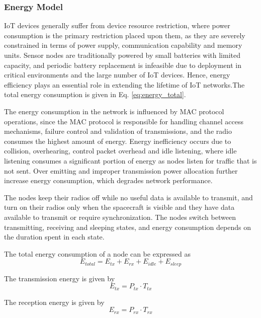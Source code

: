 \documentclass[a4paper,fleqn]{cas-dc}
\numberwithin{equation}{section}
\begin{document}
\subsubsection{Energy Model}

IoT devices generally suffer from device resource restriction, where power consumption is the primary restriction placed upon them, as they are severely constrained in terms of power supply, communication capability and memory units. Sensor nodes are traditionally powered by small batteries with limited capacity, and periodic battery replacement is infeasible due to deployment in critical environments and the large number of IoT devices. Hence, energy efficiency plays an essential role in extending the lifetime of IoT networks.The total energy consumption is given in Eq. \ref{eq:energy_total}.

The energy consumption in the network is influenced by MAC protocol operations, since the MAC protocol is responsible for handling channel access mechanisms, failure control and validation of transmissions, and the radio consumes the highest amount of energy. Energy inefficiency occurs due to collision, overhearing, control packet overhead and idle listening, where idle listening consumes a significant portion of energy as nodes listen for traffic that is not sent. Over emitting and improper transmission power allocation further increase energy consumption, which degrades network performance.

The nodes keep their radios off while no useful data is available to transmit, and turn on their radios only when the spacecraft is visible and they have data available to transmit or require synchronization. The nodes switch between transmitting, receiving and sleeping states, and energy consumption depends on the duration spent in each state.

The total energy consumption of a node can be expressed as
\begin{equation}
E_{total} = E_{tx} + E_{rx} + E_{idle} + E_{sleep}
\label{eq:energy_total}
\end{equation}

The transmission energy is given by
\begin{equation}
E_{tx} = P_{tx} \cdot T_{tx}
\label{eq:energy_tx}
\end{equation}

The reception energy is given by
\begin{equation}
E_{rx} = P_{rx} \cdot T_{rx}
\label{eq:energy_rx}
\end{equation}
\end{document}
